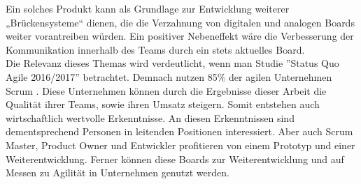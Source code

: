 \documentclass[12pt,titlepage]{scrartcl}
\begin{document}
Ein solches Produkt kann als Grundlage zur Entwicklung weiterer „Brückensysteme“ dienen, die die Verzahnung von digitalen und analogen Boards weiter vorantreiben würden. Ein positiver Nebeneffekt wäre die Verbesserung der Kommunikation innerhalb des Teams durch ein stets aktuelles Board. \\
Die Relevanz dieses Themas wird verdeutlicht, wenn man Studie ''Status Quo Agile 2016/2017'' betrachtet. Demnach nutzen 85\% der agilen Unternehmen Scrum \cite{hskob}. Diese Unternehmen können durch die Ergebnisse dieser Arbeit die Qualität ihrer Teams, sowie ihren Umsatz steigern. Somit entstehen auch wirtschaftlich wertvolle Erkenntnisse. An diesen Erkenntnissen sind dementsprechend Personen in leitenden Positionen interessiert. Aber auch Scrum Master, Product Owner und Entwickler profitieren von einem Prototyp und einer Weiterentwicklung. Ferner können diese Boards zur Weiterentwicklung und auf Messen zu Agilität in Unternehmen genutzt werden. 
\newpage


 		
\end{document}
